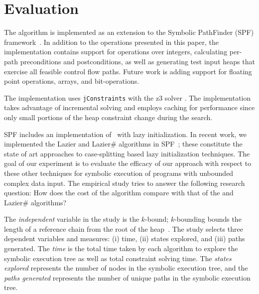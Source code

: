 \section{Evaluation}
\label{sec:evaluation}

The \symtxt{} algorithm is implemented as an extension to the Symbolic
PathFinder (SPF)
framework~\cite{DBLP:journals/ase/PasareanuVBGMR13}. In addition to the operations presented in this paper, the
implementation contains support for operations over integers,
calculating per-path preconditions and postconditions, as well as
generating test input heaps that exercise all feasible control flow
paths. Future work is adding support for floating point
operations, arrays, and bit-operations.

The \symtxt{} implementation uses \texttt{jConstraints} with the z3 solver \cite{ase2014-ghilrr,jpf2014-dghirr,deMouraBjorner08Z3}. The implementation takes advantage of incremental solving and employs caching for performance since only small portions of the heap constraint change during the search.

SPF includes an implementation of~\gsetxt{} with lazy initialization.
In recent work, we implemented the Lazier and Lazier\# algorithms in
SPF~\cite{Hillery:2014}; these constitute the state of art approaches
to case-splitting based lazy initialization techniques. The goal of our
experiment is to evaluate the efficacy of our approach with respect to these
other techniques for symbolic execution of programs
with unbounded complex data input. The empirical study tries to answer the following research question:
How does the cost of the \symtxt{} algorithm compare with that of the \gsetxt{} and Lazier\# algorithms?

The \emph{independent} variable in the study is the $k$-bound;
$k$-bounding bounds the length of a reference chain from the root of
the heap~\cite{Deng:2006}.  The study selects three dependent variables and
measures: (i) time, (ii) states explored, and (iii)
paths generated. The \emph{time} is the total time taken by each
algorithm to explore the symbolic execution tree as well as total
constraint solving time. The \emph{states explored} represents the
number of nodes in the symbolic execution tree, and the \emph{paths
  generated} represents the number of unique paths in the symbolic
execution tree.


